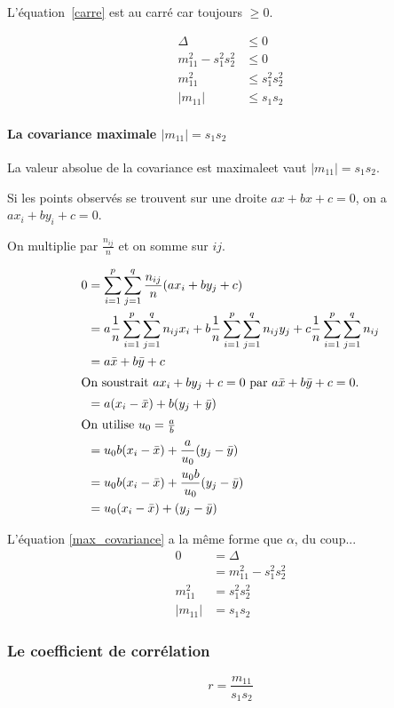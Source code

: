 L'équation~\eqref{carre} est au carré car toujours $\geq 0$.

\begin{align*}
\Delta &\leq 0\\
m_{11}^2-s_1^2s_2^2 &\leq 0\\
m_{11}^2 &\leq s_1^2s_2^2\\
|m_{11}| &\leq s_1s_2
\end{align*}




\paragraph{La covariance maximale $|m_{11}| = s_1s_2$}

La valeur absolue de la covariance est maximaleet vaut $|m_{11}| = s_1s_2$.

Si les points observés se trouvent sur une droite $ax+bx+c=0$, on a $ax_i+by_i+c=0$.

On multiplie par $\frac{n_{ij}}{n}$ et on somme sur $ij$.

\begin{align}
0  &= \sum_{i=1}^{p} \sum_{j=1}^{q} \frac{n_{ij}}{n}(ax_i+by_j+c) \\
   &= a \frac{1}{n} \sum_{i=1}^{p} \sum_{j=1}^{q}n_{ij}x_i + b \frac{1}{n} \sum_{i=1}^{p} \sum_{j=1}^{q}n_{ij}y_j + c \frac{1}{n} \sum_{i=1}^{p} \sum_{j=1}^{q}n_{ij}\\
   &= a\bar{x}+b\bar{y}+c\\
\intertext{On soustrait $ax_i+by_j+c=0$ par $a\bar{x}+b\bar{y}+c = 0$.}
   &= a(x_i-\bar{x})+b(y_j+\bar{y})\\
\intertext{On utilise $u_0=\frac{a}{b}$}
   &= u_0b(x_i-\bar{x})+\frac{a}{u_0}(y_j-\bar{y})\\
   &= u_0b(x_i-\bar{x})+\frac{u_0b}{u_0}(y_j-\bar{y})\\
   &= \label{max_covariance}u_0(x_i-\bar{x})+(y_j-\bar{y})
\end{align}

L'équation \eqref{max_covariance} a la même forme que $\alpha$, du coup...
\begin{align*}
0  &= \Delta\\
        &= m_{11}^2-s_1^2s_2^2\\
m_{11}^2 &= s_1^2s_2^2\\
|m_{11}| &= s_1s_2
\end{align*}




\subsubsection{Le coefficient de corrélation}
$$r=\frac{m_{11}}{s_1s_2}$$



